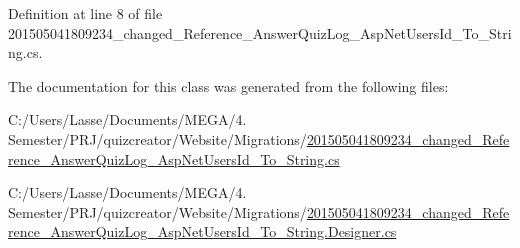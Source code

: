 Definition at line 8 of file 201505041809234\+\_\+changed\+\_\+\+Reference\+\_\+\+Answer\+Quiz\+Log\+\_\+\+Asp\+Net\+Users\+Id\+\_\+\+To\+\_\+\+String.\+cs.



The documentation for this class was generated from the following files\+:\begin{DoxyCompactItemize}
\item 
C\+:/\+Users/\+Lasse/\+Documents/\+M\+E\+G\+A/4. Semester/\+P\+R\+J/quizcreator/\+Website/\+Migrations/\hyperlink{201505041809234__changed___reference___answer_quiz_log___asp_net_users_id___to___string_8cs}{201505041809234\+\_\+changed\+\_\+\+Reference\+\_\+\+Answer\+Quiz\+Log\+\_\+\+Asp\+Net\+Users\+Id\+\_\+\+To\+\_\+\+String.\+cs}\item 
C\+:/\+Users/\+Lasse/\+Documents/\+M\+E\+G\+A/4. Semester/\+P\+R\+J/quizcreator/\+Website/\+Migrations/\hyperlink{201505041809234__changed___reference___answer_quiz_log___asp_net_users_id___to___string_8_designer_8cs}{201505041809234\+\_\+changed\+\_\+\+Reference\+\_\+\+Answer\+Quiz\+Log\+\_\+\+Asp\+Net\+Users\+Id\+\_\+\+To\+\_\+\+String.\+Designer.\+cs}\end{DoxyCompactItemize}
